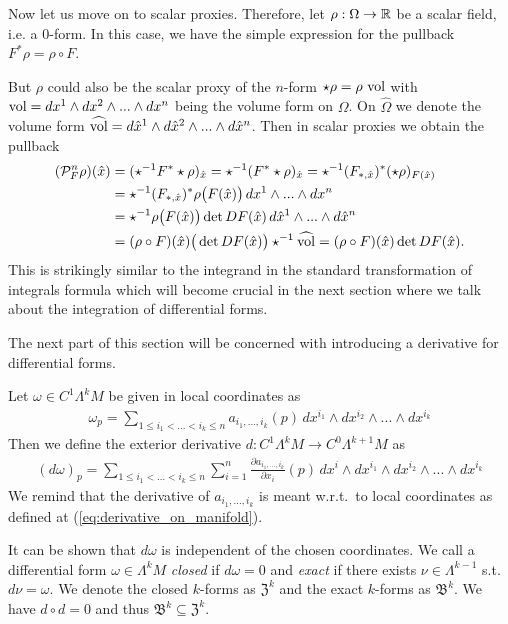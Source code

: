 \documentclass[../master_thesis.tex]{subfiles}
\begin{document}
Now let us move on to scalar proxies. Therefore, let $\rho: \Omega \rightarrow \mathbb{R}$ be 
a scalar field, i.e. a $0$-form. In this case, we 
have the simple expression for the pullback $F^* \rho = \rho \circ F$. 

But $\rho$ could also be the scalar proxy of the $n$-form 
$\star \rho = \rho\, \operatorname{vol}$ with $\operatorname{vol} = dx^1 \wedge dx^2
\wedge ... \wedge dx^n$ being the volume form on $\Omega$. 
On $\hat{\Omega}$ we denote the volume form
$\widehat{\operatorname{vol}} = d\hat{x}^1 \wedge d\hat{x}^2 \wedge ... \wedge d\hat{x}^n$.
Then in scalar proxies we obtain the pullback
\begin{align*}
    (\mathcal{P}_F^n \rho )(\hat{x}) 
    &= (\star ^{-1}F^* \star \rho)_{\hat{x}}
    = \star ^{-1} (F^* \star \rho)_{\hat{x}}
    = \star ^{-1} (F_{*,\hat{x}})^* (\star \rho)_{F(\hat{x})}
    \\ &= \star ^{-1} (F_{*,\hat{x}})^* \rho \big(F(\hat{x})\big) \, dx^1 \wedge ... \wedge dx^n
    \\ &= \star ^{-1} \rho \big(F(\hat{x}) \big) \det DF(\hat{x}) \, d\hat{x}^1 \wedge ... \wedge d\hat{x}^n
    \\ &=  (\rho \circ F)(\hat{x}) \big(\det DF(\hat{x})\big) \star^{-1}\widehat{\operatorname{vol}}
    = (\rho \circ F)(\hat{x}) \det DF(\hat{x}).
\end{align*}
This is strikingly similar to the integrand in the standard transformation 
of integrals formula which will become crucial in the next section
where we talk about the
integration of differential forms. 

The next part of this section will be 
concerned with introducing a derivative for differential forms.

\begin{definition}
    Let $\omega \in C^1\Lambda^k M$ be given in local coordinates as
    \begin{align*}
        \omega_p = \sum\limits_{1\leq i_1 < ... < i_k \leq n} 
            a_{i_1,...,i_k}(p) \,dx^{i_1} \wedge dx^{i_2} \wedge ... \wedge dx^{i_k}
    \end{align*}
    Then we define the exterior derivative $d: C^1 \Lambda^{k} M \rightarrow 
    C^0\Lambda^{k+1} M$ as
    \begin{align*}
        (d\omega)_p = \sum\limits_{1\leq i_1 < ... < i_k \leq n} \sum\limits_{i=1}^n
        \frac{\partial a_{i_1,...,i_k}}{\partial x_i}(p) \,
        dx^i \wedge dx^{i_1} \wedge dx^{i_2} \wedge ... \wedge dx^{i_k}
    \end{align*}
    We remind that the derivative of $a_{i_1,...,i_k}$ is meant w.r.t.~to
    local coordinates as defined at (\ref{eq:derivative_on_manifold}).
\end{definition}
It can be shown that $d\omega$ is independent of the chosen coordinates. 
We call a differential form $\omega \in \Lambda^k M$ 
\textit{closed} if $d\omega = 0$ and \textit{exact}
if there exists $\nu \in \Lambda^{k-1}$ s.t. $d\nu = \omega$.
We denote the closed $k$-forms as $\mathfrak{Z}^k$ and the exact 
$k$-forms as $\mathfrak{B}^k$. We have $d\circ d = 0$ and thus 
$\mathfrak{B}^k \subseteq \mathfrak{Z}^k$.
\end{document}
